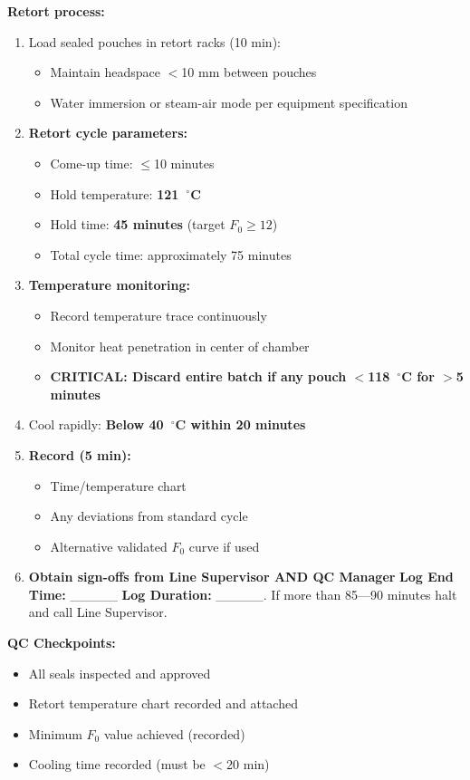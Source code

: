 {\textbf{Retort process:}
\begin{enumerate}[resume,leftmargin=1.5em]
\item Load sealed pouches in retort racks (10 min):
  \begin{itemize}
  \item Maintain headspace $<$10 mm between pouches
  \item Water immersion or steam-air mode per equipment specification
  \end{itemize}
\item \textbf{Retort cycle parameters:}
  \begin{itemize}
  \item Come-up time: $\le$10 minutes
  \item Hold temperature: \textbf{121~$^\circ$C}
  \item Hold time: \textbf{45 minutes} (target $F_0 \ge 12$)
  \item Total cycle time: approximately 75 minutes
  \end{itemize}
\item \textbf{Temperature monitoring:}
  \begin{itemize}
  \item Record temperature trace continuously
  \item Monitor heat penetration in center of chamber
  \item \textbf{CRITICAL: Discard entire batch if any pouch $<$118~$^\circ$C for $>$5 minutes}
  \end{itemize}
\item Cool rapidly: \textbf{Below 40~$^\circ$C within 20 minutes}
\item \textbf{Record (5 min):}
  \begin{itemize}
  \item Time/temperature chart
  \item Any deviations from standard cycle
  \item Alternative validated $F_0$ curve if used
  \end{itemize}
\item \textbf{Obtain sign-offs from Line Supervisor AND QC Manager}
\textbf{Log End Time:} \_\_\_\_\_
\textbf{Log Duration:} \_\_\_\_\_. If more than 85---90 minutes halt and call Line Supervisor.
\end{enumerate}

\textbf{QC Checkpoints:}
\begin{itemize}
\item All seals inspected and approved
\item Retort temperature chart recorded and attached
\item Minimum $F_0$ value achieved (recorded)
\item Cooling time recorded (must be $<$20 min)
\end{itemize}

}
